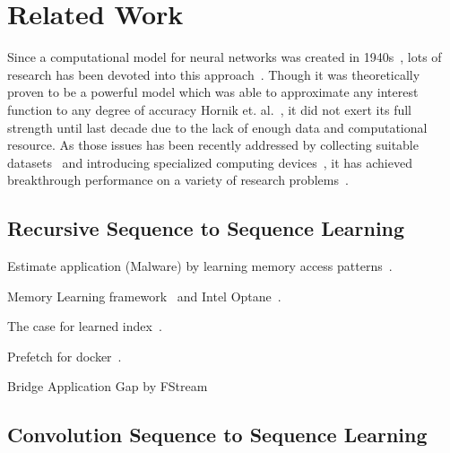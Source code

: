 \section{Related Work}

Since a computational model for neural networks was created in 1940s~\cite{McCulloch1943},
lots of research has been devoted into this approach~\cite{pouyanfar2018survey}.
Though it was theoretically proven to be a powerful model which was able to approximate any interest function to any degree of accuracy
Hornik et. al.~\cite{Hornik1989}, it did not exert its full strength until last decade due to the lack of enough data and computational resource.
As those issues has been recently addressed by collecting suitable datasets~\cite{JiaDeng2009}
and introducing specialized computing devices~\cite{Krizhevsky2012, Jouppi2017},
it has achieved breakthrough performance on a variety of research problems~\cite{Krizhevsky2012, Mnih2015, Silver2016, Bahdanau2014}.

\subsection{Recursive Sequence to Sequence Learning}

Estimate application (Malware) by learning memory access patterns~\cite{xu2017malware}.

Memory Learning framework~\cite{deng2017memory} and Intel Optane~\cite{elie2018intel}.

The case for learned index~\cite{kraska2018case}.

Prefetch for docker~\cite{anwar2018improving}.

Bridge Application Gap by FStream~\cite{rho2018fstream}

\subsection{Convolution Sequence to Sequence Learning}